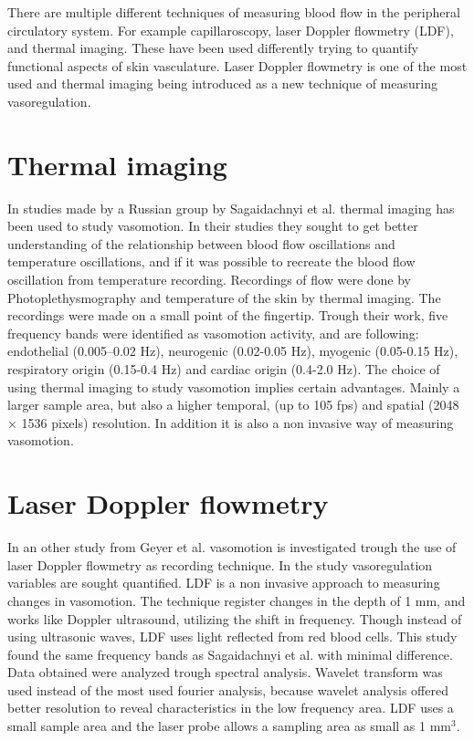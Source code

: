 There are multiple different techniques of measuring blood flow in the peripheral circulatory system. For example capillaroscopy, laser Doppler flowmetry (LDF), and thermal imaging. These have been used differently trying to quantify functional aspects of skin vasculature.\cite{liu2012} Laser Doppler flowmetry is one of the most used\cite{geyer2004} and thermal imaging being introduced as a new technique of measuring vasoregulation\cite{sagaidachnyi2014}.

\section{Thermal imaging}
\label{sec:thermalImaging}
In studies made by a Russian group by Sagaidachnyi et al. thermal imaging has been used to study vasomotion. In their studies they sought to get better understanding of the relationship between blood flow oscillations and temperature oscillations, and if it was possible to recreate the blood flow oscillation from temperature recording. Recordings of flow were done by Photoplethysmography and temperature of the skin by thermal imaging. The recordings were made on a small point of the fingertip. Trough their work, five frequency bands were identified as vasomotion activity, and are following: endothelial (0.005–0.02 Hz), neurogenic (0.02-0.05 Hz), myogenic (0.05-0.15 Hz), respiratory origin (0.15-0.4 Hz) and cardiac origin (0.4-2.0 Hz).\cite{sagaidachnyi2017,sagaidachnyi2014}
The choice of using thermal imaging to study vasomotion implies certain advantages. Mainly a larger sample area, but also a higher temporal, (up to 105 fps) and spatial (2048 × 1536 pixels) resolution. In addition it is also a non invasive way of measuring vasomotion.\cite{sagaidachnyi2017}

\section{Laser Doppler flowmetry}
In an other study from Geyer et al. vasomotion is investigated trough the use of laser Doppler flowmetry as recording technique. In the study vasoregulation variables are sought quantified. LDF is a non invasive approach to measuring changes in vasomotion. The technique register changes in the depth of 1 mm, and works like Doppler ultrasound, utilizing the shift in frequency. Though instead of using ultrasonic waves, LDF uses light reflected from red blood cells. This study found the same frequency bands as Sagaidachnyi et al. with minimal difference. Data obtained were analyzed trough spectral analysis. Wavelet transform was used instead of the most used fourier analysis, because wavelet analysis offered better resolution to reveal characteristics in the low frequency area.\cite{geyer2004}
LDF uses a small sample area and the laser probe allows a sampling area as small as 1 mm$^3$.\cite{brothers2010} 


